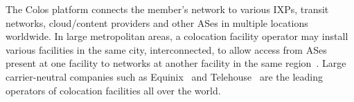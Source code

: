 	The Colos platform connects the member's network to various IXPs, transit networks, cloud/content providers and other ASes in multiple locations worldwide. In large metropolitan areas, a colocation facility operator may install various facilities in the same city, interconnected, to allow access from ASes present at one facility to networks at another facility in the same region~\cite{Giotsas:2015:MPI:2716281.2836122}. Large carrier-neutral companies such as Equinix~\cite{equinix} and Telehouse~\cite{telehouse} are the leading operators of colocation facilities all over the world. 

	


	
